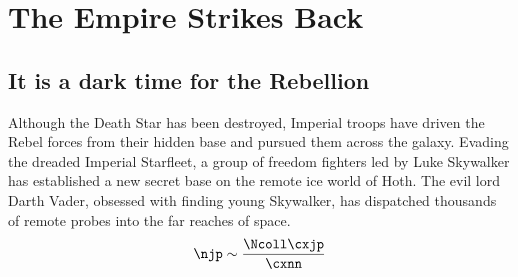 \chapter{The Empire Strikes Back}
\section{It is a dark time for the Rebellion}
 
Although the Death Star has been destroyed, Imperial troops 
have driven the Rebel forces from their hidden base and 
pursued them across the galaxy.  Evading the dreaded 
Imperial Starfleet, a group of freedom fighters led by Luke 
Skywalker has established a new secret base on the remote 
ice world of Hoth.  The evil lord Darth Vader, obsessed with 
finding young Skywalker, has dispatched thousands of remote 
probes into the far reaches of space.
\begin{equation}
\njp \sim \frac{\Ncoll \cxjp}{\cxnn}
\end{equation}
\lipsum[1-10]
\cite{THEWS_2001}
\cite{FLORKOWSKI_2010}
\cite{GROSS_1973}

\Npart
